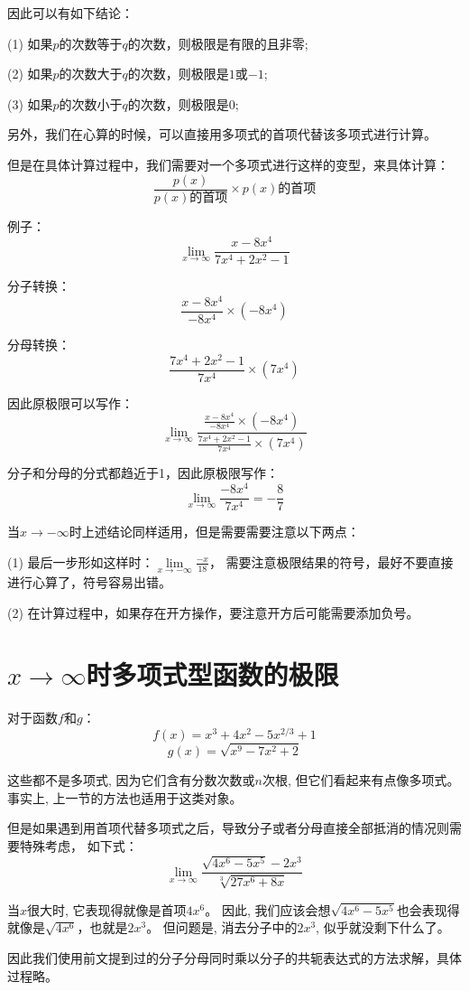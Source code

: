 \documentclass[11pt, b5paper, oneside]{book}
\begin{document}
因此可以有如下结论：

(1) 如果$p$的次数等于$q$的次数，则极限是有限的且非零;

(2) 如果$p$的次数大于$q$的次数，则极限是$1$或$-1$;

(3) 如果$p$的次数小于$q$的次数，则极限是$0$;

另外，我们在心算的时候，可以直接用多项式的首项代替该多项式进行计算。

但是在具体计算过程中，我们需要对一个多项式进行这样的变型，来具体计算：
\[\frac{p(x)}{p(x)\text{的首项}} \times p(x)\text{的首项}\]

例子：
\[\lim\limits_{x\to \infty}\frac{x-8x^4}{7x^4+2x^2-1}\]

分子转换：
\[\frac{x-8x^4}{-8x^4}\times(-8x^4)\]

分母转换：
\[\frac{7x^4+2x^2-1}{7x^4}\times(7x^4)\]

因此原极限可以写作：
\[\lim\limits_{x\to \infty} \frac{\frac{x-8x^4}{-8x^4}\times(-8x^4)}{\frac{7x^4+2x^2-1}{7x^4}\times(7x^4)}\]

分子和分母的分式都趋近于1，因此原极限写作：
\[\lim\limits_{x\to \infty} \frac{-8x^4}{7x^4} = -\frac{8}{7}\]

当$x\rightarrow -\infty$时上述结论同样适用，但是需要需要注意以下两点：

(1) 最后一步形如这样时：$\lim\limits_{x\to-\infty}\frac{-x}{18}$，
需要注意极限结果的符号，最好不要直接进行心算了，符号容易出错。

(2) 在计算过程中，如果存在开方操作，要注意开方后可能需要添加负号。

\section{$x\rightarrow \infty$时多项式型函数的极限}

对于函数$f$和$g$：
\[f(x)=x^3+4x^2-5x^{2/3}+1\]
\[g(x)=\sqrt{x^9-7x^2+2}\]


这些都不是多项式, 因为它们含有分数次数或$n$次根, 但它们看起来有点像多项式。
事实上, 上一节的方法也适用于这类对象。

但是如果遇到用首项代替多项式之后，导致分子或者分母直接全部抵消的情况则需要特殊考虑，
如下式：
\[\lim\limits_{x\to \infty}\frac{\sqrt{4x^6-5x^5}-2x^3}{\sqrt[3]{27x^6+8x}}\]

当$x$很大时, 它表现得就像是首项$4x^6$。
因此, 我们应该会想$\sqrt{4x^6-5x^5}$也会表现得就像是$\sqrt{4x^6}$，也就是$2x^3$。
但问题是, 消去分子中的$2x^3$, 似乎就没剩下什么了。

因此我们使用前文提到过的分子分母同时乘以分子的共轭表达式的方法求解，具体过程略。
\end{document}
